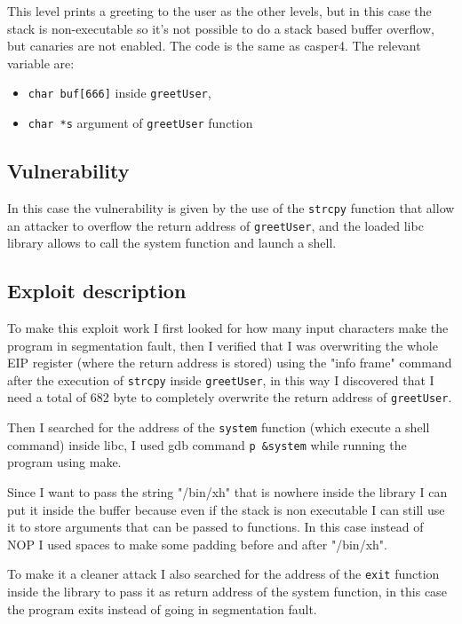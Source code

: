\documentclass[a4paper,12pt]{article}
\begin{document}
This level prints a greeting to the user as the other levels, but in this case the stack is non-executable so it's not possible to do a stack based buffer overflow, but canaries are not enabled. The code is the same as casper4.
The relevant variable are:

\begin{itemize}
\item \texttt{char buf[666]} inside \texttt{greetUser},
\item \texttt{char *s} argument of \texttt{greetUser} function
\end{itemize}

\subsection{Vulnerability}

In this case the vulnerability is given by the use of the \texttt{strcpy} function that allow an attacker to overflow the return address of \texttt{greetUser}, and the loaded libc library allows to call the system function and launch a shell.

\subsection{Exploit description} 

To make this exploit work I first looked for how many input characters make the program in segmentation fault, then I verified that I was overwriting the whole EIP register (where the return address is stored) using the "info frame" command after the execution of \texttt{strcpy} inside \texttt{greetUser}, in this way I discovered that I need a total of 682 byte to completely overwrite the return address of \texttt{greetUser}.

Then I searched for the address of the \texttt{system} function (which execute a shell command) inside libc, I used gdb command \texttt{p \&system} while running the program using make.

Since I want to pass the string "/bin/xh" that is nowhere inside the library I can put it inside the buffer because even if the stack is non executable I can still use it to store arguments that can be passed to functions. In this case instead of NOP I used spaces to make some padding before and after "/bin/xh".

To make it a cleaner attack I also searched for the address of the \texttt{exit} function inside the library to pass it as return address of the system function, in this case the program exits instead of going in segmentation fault.
\end{document}

